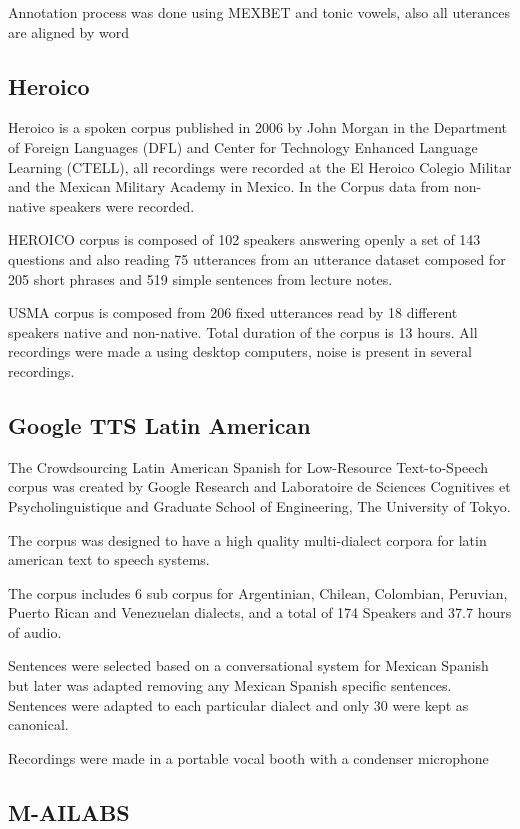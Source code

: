 \documentclass{article}
\begin{document}
Annotation process was done using MEXBET and tonic vowels, also all uterances are aligned by word

\subsection{Heroico}

Heroico is a spoken corpus published in 2006 by John Morgan in the Department of Foreign Languages (DFL) and Center for Technology Enhanced Language Learning (CTELL), all recordings were recorded at the El Heroico Colegio Militar and the Mexican Military Academy in Mexico. In the Corpus data from non-native speakers were recorded.

HEROICO corpus is composed of 102 speakers answering openly a set of 143 questions and also reading 75 utterances from an utterance dataset composed for 205 short phrases and 519 simple sentences from lecture notes.

USMA corpus is composed from 206 fixed utterances read by 18 different speakers native and non-native. Total duration of the corpus is 13 hours. All recordings were made a using desktop computers, noise is present in several recordings.
 
\subsection{Google TTS Latin American}

The Crowdsourcing Latin American Spanish for Low-Resource Text-to-Speech corpus was created by Google Research and Laboratoire de Sciences Cognitives et Psycholinguistique and Graduate School of Engineering, The University of Tokyo.

The corpus was designed to have a high quality multi-dialect corpora for latin american text to speech systems.

The corpus includes 6 sub corpus for Argentinian, Chilean, Colombian, Peruvian, Puerto Rican and Venezuelan dialects, and a total of 174 Speakers and 37.7 hours of audio.

Sentences were selected based on a conversational system for Mexican Spanish but later was adapted removing any Mexican Spanish specific sentences. Sentences were adapted to each particular dialect and only 30 were kept as canonical.

Recordings were made in a portable vocal booth with a condenser microphone

\subsection{M-AILABS}
\end{document}
